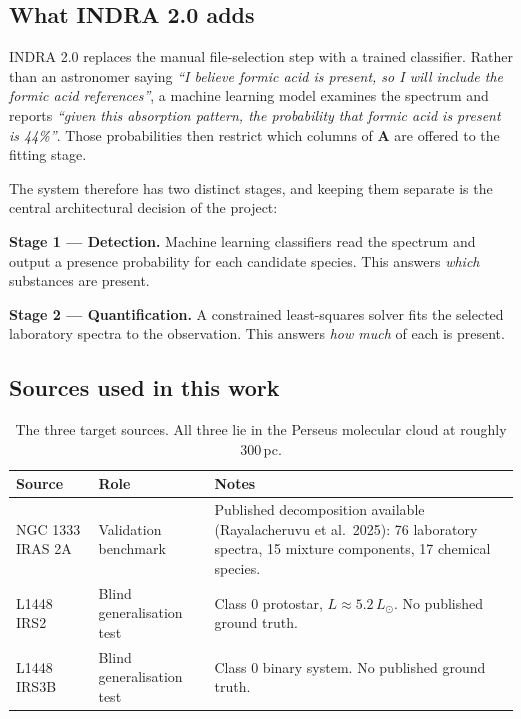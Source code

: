 \documentclass[11pt,a4paper]{article}
\begin{document}
\subsection{What INDRA 2.0 adds}

INDRA 2.0 replaces the manual file-selection step with a trained
classifier. Rather than an astronomer saying \emph{``I believe formic acid
is present, so I will include the formic acid references''}, a machine
learning model examines the spectrum and reports \emph{``given this
absorption pattern, the probability that formic acid is present is
44\%''}. Those probabilities then restrict which columns of $\mathbf{A}$
are offered to the fitting stage.

The system therefore has two distinct stages, and keeping them separate is
the central architectural decision of the project:

\begin{keybox}
\textbf{Stage 1 --- Detection.} Machine learning classifiers read the
spectrum and output a presence probability for each candidate species.
This answers \emph{which} substances are present.

\vspace{4pt}
\textbf{Stage 2 --- Quantification.} A constrained least-squares solver
fits the selected laboratory spectra to the observation. This answers
\emph{how much} of each is present.
\end{keybox}

\subsection{Sources used in this work}

\begin{table}[H]
\centering
\small
\begin{tabular}{@{}L{3.4cm}L{4.6cm}L{6.0cm}@{}}
\toprule
\textbf{Source} & \textbf{Role} & \textbf{Notes} \\
\midrule
NGC 1333 IRAS 2A & Validation benchmark &
Published decomposition available (Rayalacheruvu et al.\ 2025): 76
laboratory spectra, 15 mixture components, 17 chemical species. \\
L1448 IRS2 & Blind generalisation test &
Class 0 protostar, $L\approx5.2\,L_\odot$. No published ground truth. \\
L1448 IRS3B & Blind generalisation test &
Class 0 binary system. No published ground truth. \\
\bottomrule
\end{tabular}
\caption{The three target sources. All three lie in the Perseus molecular
cloud at roughly 300\,pc.}
\end{table}
\end{document}
